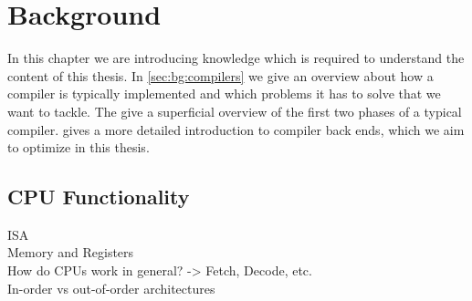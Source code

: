 \chapter{Background}
In this chapter we are introducing knowledge which is required to understand the content of this thesis.
In \cref{sec:bg:compilers} we give an overview about how a compiler is typically implemented and which problems it has to solve that we want to tackle.
The  give a superficial overview of the first two phases of a typical compiler.
 gives a more detailed introduction to compiler back ends, which we aim to optimize in this thesis.


\section{CPU Functionality}
ISA\\
Memory and Registers\\
How do CPUs work in general? -> Fetch, Decode, etc.\\
In-order vs out-of-order architectures

